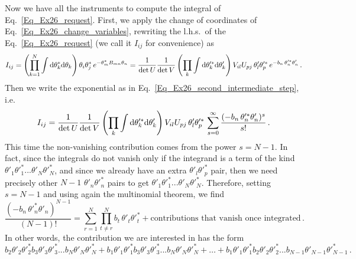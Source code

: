 \begin{sol}
    Now we have all the instruments to compute the integral of Eq.~\eqref{Eq_Ex26_request}. First, we apply the change of coordinates of Eq.~\eqref{Eq_Ex26_change_variables}, rewriting the l.h.s.~of the Eq.~\eqref{Eq_Ex26_request} (we call it $I_{ij}$ for convenience) as
    \begin{equation}
        I_{ij} 
        =\left(\prod_{k=1}^{N} \int {\rm d} \theta_k^{*} {\rm d} \theta_k \right) \theta_{i}\theta_{j}^* \, e^{- \theta_{m}^{*}B_{mn}\theta_{n}}
        = \frac{1}{\det U}\frac{1}{\det V} \left(\prod_k \int {\rm d} \theta_k'^{*} {\rm d}\theta'_k \right) V_{il} U_{pj} \, \theta'_{l} \theta'^{*}_{p} \, e^{- b_{n}\, \theta'^{*}_{n} \theta'_{n}} \, .
        \label{Eq_Ex26_third_intermediate_step1}
    \end{equation}
    Then we write the exponential as in Eq.~\eqref{Eq_Ex26_second_intermediate_step}, i.e.
    \begin{equation}
        I_{ij}
        = \frac{1}{\det U}\frac{1}{\det V} \left(\prod_k \int {\rm d} \theta_k'^{*} {\rm d}\theta'_k \right) V_{il} U_{pj} \, \theta'_{l} \theta'^{*}_{p} \, \sum_{s=0}^{\infty} \frac{(- b_{n}\, \theta'^{*}_{n} \theta'_{n})^s}{s!} \, .
        \label{Eq_Ex26_third_intermediate_step2}
    \end{equation}
    This time the non-vanishing contribution comes from the power $s = N-1$. In fact, since the integrals do not vanish only if the integrand is a term of the kind $\theta'_1 \theta'^{*}_1 ... \theta'_N \theta'^{*}_N$, and since we already have an extra $\theta'_{l} \theta'^{*}_{p}$ pair, then we need precisely other $N-1$ $\theta'_{n} \theta'^{*}_{n}$ pairs to get $\theta'_1 \theta'^{*}_1 ... \theta'_N \theta'^{*}_N$. Therefore, setting $s = N-1$ and using again the multinomial theorem, we find 
    \begin{equation}
        \frac{(- b_{n}\, \theta'^{*}_{n} \theta'_{n})^{N-1}}{(N-1)!} = \sum_{r=1}^{N} \prod_{t \not= r}^{N} b_{t}\, \theta'_{t} \theta'^{*}_{t} + \text{contributions that vanish once integrated} \, .
    \end{equation}
    In other words, the contribution we are interested in has the form
    \begin{equation}
    \label{davidonemifalavoraredisera}
        b_2 \theta'_2 \theta'^*_2 b_3 \theta'_3 \theta'^*_3 ... b_N \theta'_N \theta'^*_N 
        + b_1 \theta'_1 \theta'^*_1 b_3 \theta'_3 \theta'^*_3 ... b_N \theta'_N \theta'^*_N 
        + \dots 
        +b_1 \theta'_1 \theta'^*_1 b_2 \theta'_2 \theta'^*_2 ... b_{N-1} \theta'_{N-1} \theta'^*_{N-1} \,.

\end{equation}
\end{sol}
